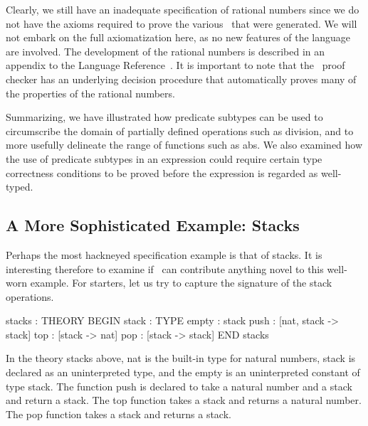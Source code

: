 Clearly, we still have an inadequate specification of rational numbers
since we do not have the axioms required to prove the various \tccs\ that
were generated.  We will not embark on the full axiomatization here, as
no new features of the language are involved.  The development of the
rational numbers is described in an appendix to the Language
Reference~\cite{PVS:language}.  It is important to note that the \pvs\
proof checker has an underlying decision procedure that automatically
proves many of the properties of the rational numbers.

Summarizing, we have illustrated how predicate subtypes can be used
to circumscribe the domain of partially defined operations such as
division, and to more usefully delineate the range of functions such as
{\stt abs}.  We also examined how the use of predicate subtypes in an
expression could require certain type correctness conditions to be
proved before the expression is regarded as well-typed.


\subsection{A More Sophisticated Example: Stacks}

Perhaps the most hackneyed specification example is that of stacks.  It
is interesting therefore to examine if \pvs\ can contribute anything
novel to this well-worn example.  For starters, let us try to capture
the signature of the stack operations.
\begin{pvsex}
  stacks : THEORY
   BEGIN
    stack : TYPE
    empty : stack
    push : [nat, stack -> stack]
    top : [stack -> nat]
    pop : [stack -> stack]
   END stacks
\end{pvsex}
%
In the theory {\stt stacks} above, {\stt nat} is the built-in type for
natural numbers, {\stt stack} is declared as an uninterpreted type,
and the {\stt empty} is an uninterpreted constant of type {\stt
stack}.  The function {\stt push} is declared to take a natural number
and a stack and return a stack.  The {\stt top} function takes a stack
and returns a natural number.  The {\stt pop} function takes a stack
and returns a stack.

